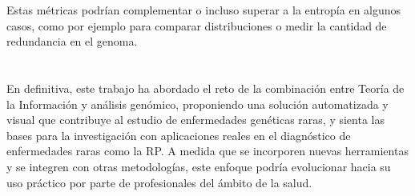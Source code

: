 \documentclass[11pt,spanish,listoffigures,listoftables]{tfgetsinf}
\begin{document}
Estas métricas podrían complementar o incluso superar a la entropía en algunos casos, como por ejemplo para comparar distribuciones o medir la cantidad de redundancia en el genoma.\\\\\\

En definitiva, este trabajo ha abordado el reto de la combinación entre Teoría de la Información y análisis genómico, proponiendo una solución automatizada y visual que contribuye al estudio de enfermedades genéticas raras, y sienta las bases para la investigación con aplicaciones reales en el diagnóstico de enfermedades raras como la \acs{RP}. A medida que se incorporen nuevas herramientas y se integren con otras metodologías, este enfoque podría evolucionar hacia su uso práctico por parte de profesionales del ámbito de la salud.




\end{document}
